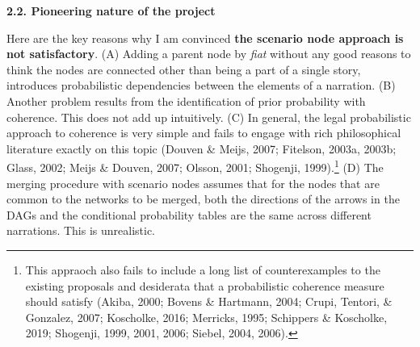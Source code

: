 \documentclass[11pt,dvipsnames,enabledeprecatedfontcommands]{scrartcl}
\begin{document}
\vspace{1mm}

\noindent \large \textbf{2.2. Pioneering nature of the project}

\vspace{1mm} \normalsize

Here are the key reasons why I am convinced
\textbf{the scenario node approach is not satisfactory}. (A) Adding a
parent node by \emph{fiat} without any good reasons to think the nodes
are connected other than being a part of a single story, introduces
probabilistic dependencies between the elements of a narration. (B)
Another problem results from the identification of prior probability
with coherence. This does not add up intuitively. (C) In general, the
legal probabilistic approach to coherence is very simple and fails to
engage with rich philosophical literature exactly on this topic (Douven
\& Meijs, 2007; Fitelson, 2003a, 2003b; Glass, 2002; Meijs \& Douven,
2007; Olsson, 2001; Shogenji, 1999).\footnote{This appraoch also fails
  to include a long list of counterexamples to the existing proposals
  and desiderata that a probabilistic coherence measure should satisfy
  (Akiba, 2000; Bovens \& Hartmann, 2004; Crupi, Tentori, \& Gonzalez,
  2007; Koscholke, 2016; Merricks, 1995; Schippers \& Koscholke, 2019;
  Shogenji, 1999, 2001, 2006; Siebel, 2004, 2006).} (D) The merging
procedure with scenario nodes assumes that for the nodes that are common
to the networks to be merged, both the directions of the arrows in the
DAGs and the conditional probability tables are the same across
different narrations. This is unrealistic.
\end{document}
